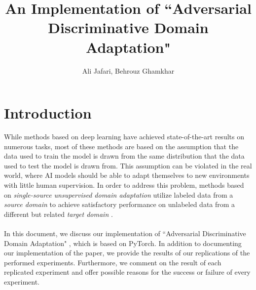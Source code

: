 \documentclass[14pt]{extarticle}
\title{An Implementation of ``Adversarial Discriminative Domain Adaptation"}
\author{Ali Jafari, Behrouz Ghamkhar}
\begin{document}
	\maketitle
	\newpage
	\tableofcontents
	\newpage
	\section{Introduction}
		While methods based on deep learning have achieved state-of-the-art results on numerous tasks, most of these methods are based on the assumption that the data used to train the model is drawn from the same distribution that the data used to test the model is drawn from. This assumption can be violated in the real world, where AI models should be able to adapt themselves to new environments with little human supervision. In order to address this problem, methods based on \textit{single-source unsupervised domain adaptation} utilize labeled data from a \textit{source domain} to achieve satisfactory performance on unlabeled data from a different but related \textit{target domain} \cite{udasurvey}.\\\\
		In this document, we discuss our implementation of ``Adversarial Discriminative Domain Adaptation" \cite{adda}, which is based on PyTorch. In addition to documenting our implementation of the paper, we provide the results of our replications of the performed experiments. Furthermore, we comment on the result of each replicated experiment and offer possible reasons for the success or failure of every experiment.
\end{document}
